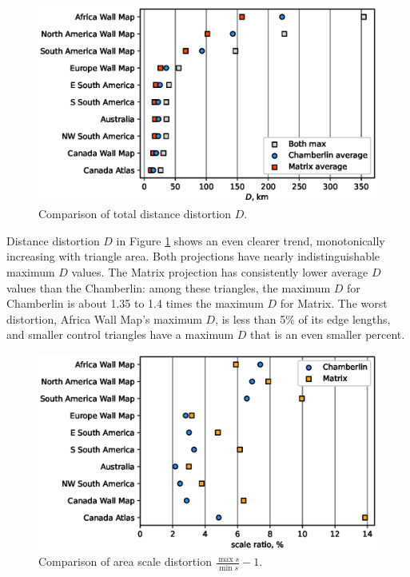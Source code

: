 \documentclass[]{interact}
\begin{document}
\begin{figure}
  \includegraphics[width=\textwidth]{distanceplot}
  \caption{Comparison of total distance distortion $D$.}
  \label{fig:distancep}
\end{figure}

Distance distortion $D$ in Figure \ref{fig:distancep} shows an even clearer
trend, monotonically increasing with triangle area. Both projections have nearly
indistinguishable maximum $D$ values. The Matrix projection has consistently
lower average $D$ values than the Chamberlin: among these triangles, the maximum
$D$ for Chamberlin is about 1.35 to 1.4 times the maximum $D$ for Matrix. The
worst distortion,
Africa Wall Map's maximum $D$, is less than 5\% of its edge lengths, and
smaller control triangles have a maximum $D$ that is an even smaller percent.

\begin{figure}
  \includegraphics[width=\textwidth]{scaleplot}
  \caption{Comparison of area scale distortion $\frac{\max s}{\min s} - 1$.}
  \label{fig:scalep}
\end{figure}
\end{document}
